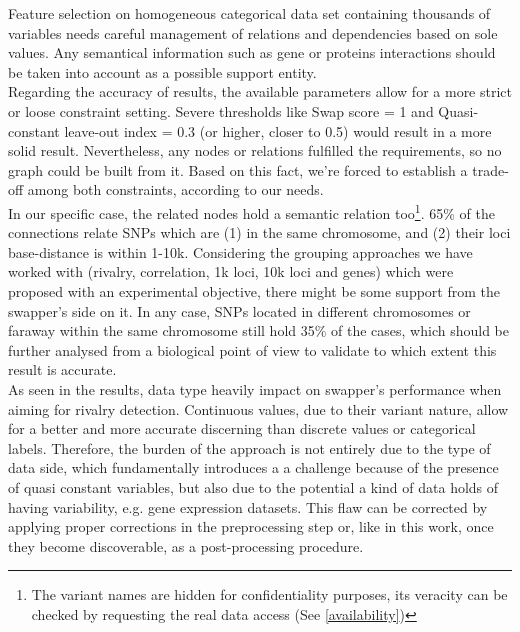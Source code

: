 Feature selection on homogeneous categorical data set containing thousands of variables needs careful management of relations and dependencies based on sole values. Any semantical information such as gene or proteins interactions should be taken into account as a possible support entity.
\\

Regarding the accuracy of results, the available parameters allow for a more strict or loose constraint setting. Severe thresholds like Swap score = 1 and Quasi-constant leave-out index = 0.3 (or higher, closer to 0.5) would result in a more solid result. Nevertheless, any nodes or relations fulfilled the requirements, so no graph could be built from it. Based on this fact, we're forced to establish a trade-off among both constraints, according to our needs.
\\

In our specific case, the related nodes hold a semantic relation too\footnote{The variant names are hidden for confidentiality purposes, its veracity can be checked by requesting the real data access (See \ref{availability})}. 65\% of the connections relate SNPs which are (1) in the same chromosome, and (2) their loci base-distance is within 1-10k. Considering the grouping approaches we have worked with (rivalry, correlation, 1k loci, 10k loci and genes) which were proposed with an experimental objective, there might be some support from the swapper's side on it. In any case, SNPs located in different chromosomes or faraway within the same chromosome still hold 35\% of the cases, which should be further analysed from a biological point of view to validate to which extent this result is accurate.
\\

As seen in the results, data type heavily impact on swapper's performance when aiming for rivalry detection. Continuous values, due to their variant nature, allow for a better and more accurate discerning than discrete values or categorical labels. Therefore, the burden of the approach is not entirely due to the type of data side, which fundamentally introduces a a challenge because of the presence of quasi constant variables, but also due to the potential a kind of data holds of having variability, e.g. gene expression datasets.
This flaw can be corrected by applying proper corrections in the preprocessing step or, like in this work, once they become discoverable, as a post-processing procedure.